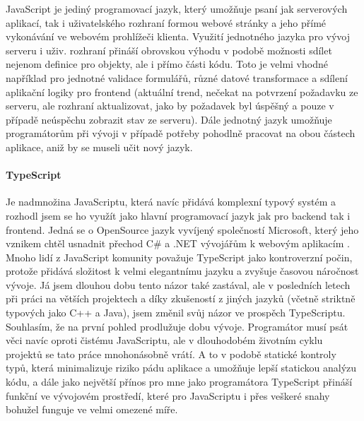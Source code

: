 JavaScript je jediný programovací jazyk, který umožňuje psaní jak serverových aplikací, tak i uživatelského rozhraní formou webové stránky a jeho přímé vykonávání ve webovém prohlížeči klienta. Využití jednotného jazyka pro vývoj serveru i uživ. rozhraní přináší obrovskou výhodu v podobě možnosti sdílet nejenom definice pro objekty, ale i přímo části kódu. Toto je velmi vhodné například pro jednotné validace formulářů, různé datové transformace a sdílení aplikační logiky pro frontend  (aktuální trend, nečekat na potvrzení požadavku ze serveru, ale rozhraní aktualizovat, jako by požadavek byl úspěšný a pouze v případě neúspěchu zobrazit stav ze serveru). Dále jednotný jazyk umožňuje programátorům při vývoji v případě potřeby pohodlně pracovat na obou částech aplikace, aniž by se museli učit nový jazyk.

\paragraph{TypeScript} Je nadmnožina JavaScriptu, která navíc přidává komplexní typový systém \cite{ts} a rozhodl jsem se ho využít jako hlavní programovací jazyk jak pro backend tak i frontend. Jedná se o OpenSource jazyk vyvíjený společností Microsoft, který jeho vznikem chtěl usnadnit přechod C\# a .NET vývojářům k webovým aplikacím \cite{ts}. Mnoho lidí z JavaScript komunity považuje TypeScript jako kontroverzní počin, protože přidává složitost k velmi elegantnímu jazyku a zvyšuje časovou náročnost vývoje. Já jsem dlouhou dobu tento názor také zastával, ale v posledních letech při práci na větších projektech a díky zkušeností z jiných jazyků (včetně striktně typových jako C++ a Java), jsem změnil svůj názor ve prospěch TypeScriptu. Souhlasím, že na první pohled prodlužuje dobu vývoje. Programátor musí psát věci navíc oproti čistému JavaScriptu, ale v dlouhodobém životním cyklu projektů se tato práce  mnohonásobně vrátí. A to v podobě statické kontroly typů, která minimalizuje riziko pádu aplikace a umožňuje  lepší statickou analýzu kódu, a dále jako největší přínos pro mne jako programátora TypeScript přináší funkční  ve vývojovém prostředí, které pro JavaScriptu i přes veškeré snahy bohužel funguje ve velmi omezené míře.


